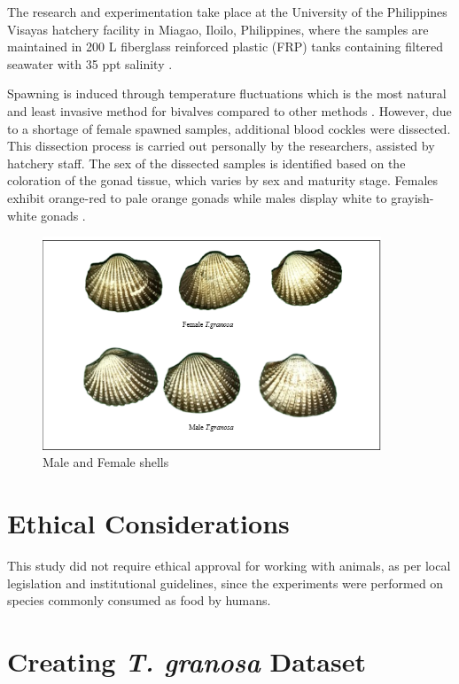 The research and experimentation take place at the University of the Philippines Visayas hatchery facility in Miagao, Iloilo, Philippines, where the samples are maintained in 200 L fiberglass reinforced plastic (FRP) tanks containing filtered seawater with 35 ppt salinity \cite{miranda2023}. 

Spawning is induced through temperature fluctuations which is the most natural and least invasive method for bivalves compared to other methods \cite{aji}. However, due to a shortage of female spawned samples, additional blood cockles were dissected. This dissection process is carried out personally by the researchers, assisted by hatchery staff. The sex of the dissected samples is identified based on the coloration of the gonad tissue, which varies by sex and maturity stage. Females exhibit orange-red to pale orange gonads while males display white to grayish-white gonads \cite{may2021}.

\begin{figure}[!htbp]
	\centering
	\includegraphics[width=0.9\textwidth]{figures/male-female T.granosa.png}
	\caption{Male and Female \Tegillarcagranosa shells}
\end{figure}

\section{Ethical Considerations}
\label{sec:ethical}

This study did not require ethical approval for working with animals, as per local legislation and institutional guidelines, since the experiments were performed on species commonly consumed as food by humans.


\section{Creating \textit{T. granosa} Dataset}
\label{sec:dataset}


